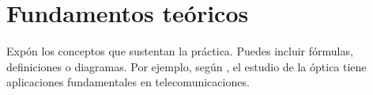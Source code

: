 
\section{Fundamentos teóricos}
Expón los conceptos que sustentan la práctica. Puedes incluir fórmulas, definiciones o diagramas. Por ejemplo, según \cite{2022}, el estudio de la óptica tiene aplicaciones fundamentales en telecomunicaciones.